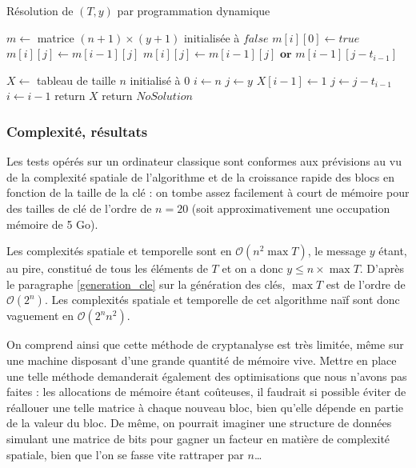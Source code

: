 \begin{algorithm}[!h]
\caption{Résolution de $(T, y)$ par programmation dynamique}
\begin{algorithmic}[1]
\label{subset_algo}
\State $m \leftarrow$ matrice $(n+1) \times (y+1)$ initialisée à $false$
\State $m[i][0] \leftarrow true$
\EndFor
{}
		\State $m[i][j] \leftarrow m[i-1][j]$
	\Else
		\State $m[i][j] \leftarrow m[i-1][j] \textbf{ or } m[i-1][j-t_{i-1}]$
	\EndIf
\EndFor
\EndFor

\State $X \leftarrow$ tableau de taille $n$ initialisé à $0$
\State $i \leftarrow n$
\State $j \leftarrow y$
\State $X[i-1] \leftarrow 1$
\State $j \leftarrow j - t_{i-1}$
\EndIf
\State $i \leftarrow i-1$
\EndWhile
{}
\State return $X$
\Else
\State return $NoSolution$
\EndIf
\end{algorithmic}
\end{algorithm}


\subsubsection{Complexité, résultats}

Les tests opérés sur un ordinateur classique sont conformes aux prévisions au vu de la complexité spatiale
de l'algorithme et de la croissance rapide des blocs en fonction de la taille de la clé : on tombe assez facilement à court de mémoire pour des tailles de clé de l'ordre de $n = 20$ (soit approximativement une occupation mémoire de 5 Go).

Les complexités spatiale et temporelle sont en $\mathcal{O}(n^2 \max T)$, le message $y$ étant, au pire, constitué de tous les éléments de $T$ et on a donc $y \leq n \times \max T$. D'après le paragraphe \ref{generation_cle} sur la génération des clés, $\max T$ est de l'ordre de $\mathcal{O}(2^n)$. Les complexités spatiale et temporelle de cet algorithme naïf sont donc vaguement en $\mathcal{O}(2^n n^2)$.

On comprend ainsi que cette méthode de cryptanalyse est très limitée, même sur une machine disposant d'une grande quantité de mémoire vive. Mettre en place une telle méthode demanderait également des optimisations que nous n'avons pas faites : les allocations de mémoire étant coûteuses, il faudrait si possible éviter de réallouer une telle matrice à chaque nouveau bloc, bien qu'elle dépende en partie de la valeur du bloc. De même, on pourrait imaginer une structure de données simulant une matrice de bits pour gagner un facteur en matière de complexité spatiale, bien que l'on se fasse vite rattraper par $n$…

